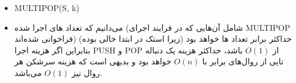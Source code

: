 \begin{itemize}
\item
\begin{minipage}{0.7\linewidth}
\begin{LTR}
\begin{algorithm}[H]
\caption{MULTIPOP(S, k)}
\end{algorithm}
\end{LTR}
\end{minipage}
\item می‌دانیم که تعداد های اجرا شده (شامل آن‌هایی که در فرایند اجرای MULTIPOP فراخوانی شده‌اند)
حداکثر برابر تعداد ها خواهد بود (زیرا استک در ابتدا خالی بوده) بنابراین
اگر هزینه اجرا PUSH و POP از $O(1)$ باشد، حداکثر هزینه یک دنباله
تایی از روال‌های  برابر با $O(n)$ خواهد بود و
بدیهی است که هزینه سرشکن هر روال نیز $O(1)$ می‌باشد.
\end{itemize}
